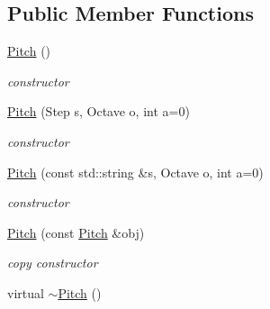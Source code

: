 \subsection*{\-Public \-Member \-Functions}
\begin{DoxyCompactItemize}
\item 
\hypertarget{classsinsy_1_1Pitch_a09a5f5040f1902afa6d81520cf7bd084}{\hyperlink{classsinsy_1_1Pitch_a09a5f5040f1902afa6d81520cf7bd084}{\-Pitch} ()}\label{classsinsy_1_1Pitch_a09a5f5040f1902afa6d81520cf7bd084}

\begin{DoxyCompactList}\small\item\em constructor \end{DoxyCompactList}\item 
\hypertarget{classsinsy_1_1Pitch_a0023997abd264bc28c39796d3a108c27}{\hyperlink{classsinsy_1_1Pitch_a0023997abd264bc28c39796d3a108c27}{\-Pitch} (\-Step s, \-Octave o, int a=0)}\label{classsinsy_1_1Pitch_a0023997abd264bc28c39796d3a108c27}

\begin{DoxyCompactList}\small\item\em constructor \end{DoxyCompactList}\item 
\hypertarget{classsinsy_1_1Pitch_a969d1c0dd6da4b825b8a24a5bd6cdb6f}{\hyperlink{classsinsy_1_1Pitch_a969d1c0dd6da4b825b8a24a5bd6cdb6f}{\-Pitch} (const std\-::string \&s, \-Octave o, int a=0)}\label{classsinsy_1_1Pitch_a969d1c0dd6da4b825b8a24a5bd6cdb6f}

\begin{DoxyCompactList}\small\item\em constructor \end{DoxyCompactList}\item 
\hypertarget{classsinsy_1_1Pitch_afb79fed2c0502f82fcc8f9cc116bad90}{\hyperlink{classsinsy_1_1Pitch_afb79fed2c0502f82fcc8f9cc116bad90}{\-Pitch} (const \hyperlink{classsinsy_1_1Pitch}{\-Pitch} \&obj)}\label{classsinsy_1_1Pitch_afb79fed2c0502f82fcc8f9cc116bad90}

\begin{DoxyCompactList}\small\item\em copy constructor \end{DoxyCompactList}\item 
\hypertarget{classsinsy_1_1Pitch_a9a592ab90f8d3ab7a5edb5b3a2de2784}{virtual \hyperlink{classsinsy_1_1Pitch_a9a592ab90f8d3ab7a5edb5b3a2de2784}{$\sim$\-Pitch} ()}\label{classsinsy_1_1Pitch_a9a592ab90f8d3ab7a5edb5b3a2de2784}


\end{DoxyCompactItemize}
